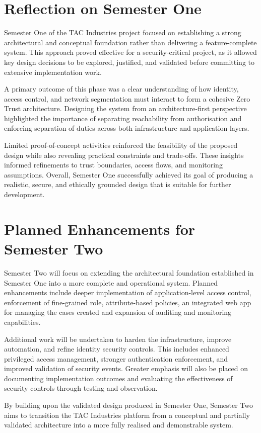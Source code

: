 \section{Reflection on Semester One}

Semester One of the TAC Industries project focused on establishing a strong architectural and conceptual foundation rather than delivering a feature-complete system. This approach proved effective for a security-critical project, as it allowed key design decisions to be explored, justified, and validated before committing to extensive implementation work.

A primary outcome of this phase was a clear understanding of how identity, access control, and network segmentation must interact to form a cohesive Zero Trust architecture. Designing the system from an architecture-first perspective highlighted the importance of separating reachability from authorisation and enforcing separation of duties across both infrastructure and application layers.

Limited proof-of-concept activities reinforced the feasibility of the proposed design while also revealing practical constraints and trade-offs. These insights informed refinements to trust boundaries, access flows, and monitoring assumptions. Overall, Semester One successfully achieved its goal of producing a realistic, secure, and ethically grounded design that is suitable for further development.

\section{Planned Enhancements for Semester Two}

Semester Two will focus on extending the architectural foundation established in Semester One into a more complete and operational system. Planned enhancements include deeper implementation of application-level access control, enforcement of fine-grained role, attribute-based policies, an integrated web app for managing the cases created and expansion of auditing and monitoring capabilities.

Additional work will be undertaken to harden the infrastructure, improve automation, and refine identity security controls. This includes enhanced privileged access management, stronger authentication enforcement, and improved validation of security events. Greater emphasis will also be placed on documenting implementation outcomes and evaluating the effectiveness of security controls through testing and observation.

By building upon the validated design produced in Semester One, Semester Two aims to transition the TAC Industries platform from a conceptual and partially validated architecture into a more fully realised and demonstrable system.